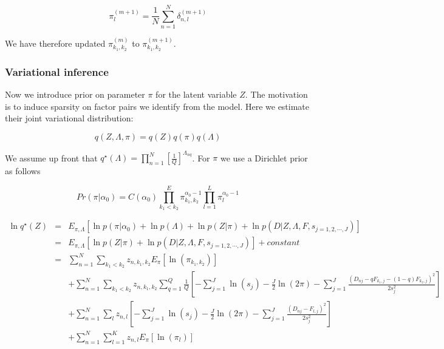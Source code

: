 \documentclass[11pt,authoryear]{article}
\begin{document}
$$ \pi^{(m+1)}_{l} = \frac{1}{N}\sum_{n=1}^{N} \delta^{(m+1)}_{n, l} $$

We have therefore updated $\pi^{(m)}_{k_1, k_2}$ to $\pi^{(m+1)}_{k_1, k_2}$.

\subsubsection{Variational inference}

Now we introduce prior on parameter $\pi$ for the latent variable $Z$. The
motivation is to induce sparsity on factor pairs we identify from the model.  
Here we estimate their joint variational distribution:

$$ q(Z, \Lambda, \pi) = q(Z) q(\pi) q(\Lambda) $$

We assume up front that $q^{\star}(\Lambda) = \prod_{n=1}^{N} \left [
  \frac{1}{Q} \right ]^{\Lambda_{nq}} $. For $\pi$ we use a Dirichlet prior as follows

$$ Pr (\pi | \alpha_{0}) = C (\alpha_0) \prod_{k_1 < k_2}^E \pi_{k_1, k_2}^{\alpha_0 -1} \prod_{l=1}^{L} \pi_{l}^{\alpha_0 -1}$$

\begin{eqnarray}
\ln q^{\star} (Z)  & = & E_{\pi, \Lambda} \left [ \ln p(\pi|\alpha_0) + \ln p(\Lambda) + \ln p(Z | \pi) + \ln p(D | Z, \Lambda, F, s_{j=1,2,\cdots,J}) \right ] \\ \nonumber
  & = & E_{\pi, \Lambda} \left [ \ln p(Z | \pi) + \ln p(D | Z, \Lambda, F, s_{j=1,2,\cdots,J}) \right] + constant \\\nonumber
  & = & \sum_{n=1}^{N} \sum_{k_1 < k_2}  z_{n, k_1, k_2} E_{\pi} \left [ \ln (\pi_{k_1, k_2}) \right ] \\ \nonumber
  &&  + \sum_{n=1}^{N} \sum_{k_1 < k_2}  z_{n, k_1, k_2} \sum_{q=1}^{Q} \frac{1}{Q} \left [ - \sum_{j=1}^{J} \ln (s_j) - \frac{J}{2} \ln (2 \pi) - \sum_{j=1}^{J} \frac{(D_{nj} - qF_{k_1,j} - (1-q)F_{k_2,j})^2}{2s^2_j} \right] \\ \nonumber
  &&  +  \sum_{n=1}^{N} \sum_{l}  z_{n, l} \left [ - \sum_{j=1}^{J} \ln (s_j) - \frac{J}{2} \ln (2 \pi) - \sum_{j=1}^{J} \frac{(D_{nj} - F_{l,j} )^2}{2s^2_j} \right] \\ \nonumber 
  && +  \sum_{n=1}^{N} \sum_{l=1}^{K} z_{n, l} E_{\pi} \left [ \ln (\pi_{l}) \right ] \\ \nonumber
\end{eqnarray}
\end{document}
